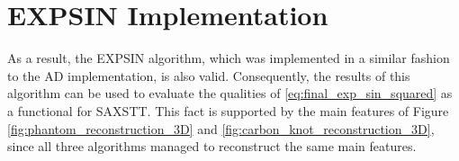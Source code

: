 \section{EXPSIN Implementation}\label{sec:saxstt_validation}
As a result, the EXPSIN algorithm, which was implemented in a similar fashion to the AD implementation, is also valid.
Consequently, the results of this algorithm can be used to evaluate the qualities of \eqref{eq:final_exp_sin_squared} as a functional for SAXSTT.
This fact is supported by the main features of Figure \ref{fig:phantom_reconstruction_3D} and \ref{fig:carbon_knot_reconstruction_3D},
since all three algorithms managed to reconstruct the same main features.

